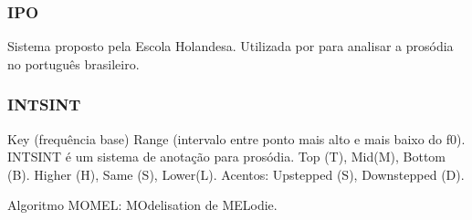 \subsubsection{IPO}
Sistema proposto pela Escola Holandesa. Utilizada por \cite{ipo} para analisar a
prosódia no português brasileiro.
\subsubsection{INTSINT}
Key (frequência base)
Range (intervalo entre ponto mais alto e mais baixo do f0).
INTSINT é um sistema de anotação para prosódia. Top (T), Mid(M), Bottom (B).
Higher (H), Same (S), Lower(L). Acentos: Upstepped (S), Downstepped (D).

Algoritmo MOMEL: MOdelisation de MELodie.
